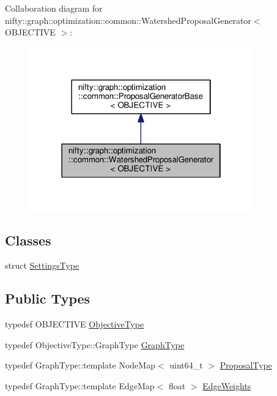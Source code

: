 Collaboration diagram for nifty\+:\+:graph\+:\+:optimization\+:\+:common\+:\+:Watershed\+Proposal\+Generator$<$ O\+B\+J\+E\+C\+T\+I\+V\+E $>$\+:\nopagebreak
\begin{figure}[H]
\begin{center}
\leavevmode
\includegraphics[width=274pt]{classnifty_1_1graph_1_1optimization_1_1common_1_1WatershedProposalGenerator__coll__graph}
\end{center}
\end{figure}
\subsection*{Classes}
\begin{DoxyCompactItemize}
\item 
struct \hyperlink{structnifty_1_1graph_1_1optimization_1_1common_1_1WatershedProposalGenerator_1_1SettingsType}{Settings\+Type}
\end{DoxyCompactItemize}
\subsection*{Public Types}
\begin{DoxyCompactItemize}
\item 
typedef O\+B\+J\+E\+C\+T\+I\+V\+E \hyperlink{classnifty_1_1graph_1_1optimization_1_1common_1_1WatershedProposalGenerator_a2de6e9c22ef125106cb152bcc78a9499}{Objective\+Type}
\item 
typedef Objective\+Type\+::\+Graph\+Type \hyperlink{classnifty_1_1graph_1_1optimization_1_1common_1_1WatershedProposalGenerator_af611ecb32c5b35254c3819c30c3e45dd}{Graph\+Type}
\item 
typedef Graph\+Type\+::template Node\+Map$<$ uint64\+\_\+t $>$ \hyperlink{classnifty_1_1graph_1_1optimization_1_1common_1_1WatershedProposalGenerator_a8cc703b2708f27f2a7820b985ebfdd11}{Proposal\+Type}
\item 
typedef Graph\+Type\+::template Edge\+Map$<$ float $>$ \hyperlink{classnifty_1_1graph_1_1optimization_1_1common_1_1WatershedProposalGenerator_a58c25ae97936dbf58091b2ffef541b33}{Edge\+Weights}
\end{DoxyCompactItemize}
